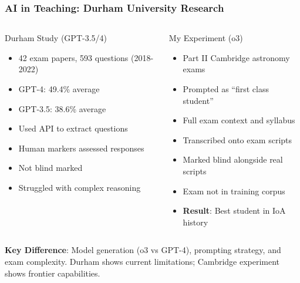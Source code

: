 \documentclass[aspectratio=169]{beamer}
\begin{document}
\begin{frame}
    \frametitle{AI in Teaching: Durham University Research}
    
    \begin{columns}
        \begin{block}{Durham Study (GPT-3.5/4)}
            \begin{itemize}
                \item 42 exam papers, 593 questions (2018-2022)
                \item GPT-4: 49.4\% average
                \item GPT-3.5: 38.6\% average
                \item Used API to extract questions
                \item Human markers assessed responses
                \item Not blind marked
                \item Struggled with complex reasoning
            \end{itemize}
        \end{block}
        
        \begin{block}{My Experiment (o3)}
            \begin{itemize}
                \item Part II Cambridge astronomy exams
                \item Prompted as ``first class student''
                \item Full exam context and syllabus
                \item Transcribed onto exam scripts
                \item Marked blind alongside real scripts
                \item Exam not in training corpus
                \item \textbf{Result}: Best student in IoA history
            \end{itemize}
        \end{block}
    \end{columns}
    
    \vspace{0.3cm}
    \textbf{Key Difference}: Model generation (o3 vs GPT-4), prompting strategy, and exam complexity. Durham shows current limitations; Cambridge experiment shows frontier capabilities.
\end{frame}

\appendix
\end{document}
